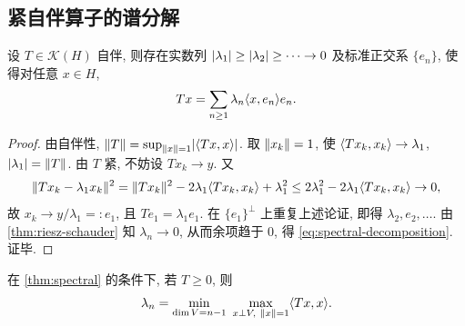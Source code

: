 \subsection{紧自伴算子的谱分解}

\begin{theorem}[谱定理]\label{thm:spectral}
设 $T\in\mathcal{K}(H)$ 自伴, 则存在实数列 $\lvert\lambda_1\rvert\ge\lvert\lambda_2\rvert\ge\cdots\to0$ 及标准正交系 $\{e_n\}$, 使得对任意 $x\in H$,
\begin{equation}\label{eq:spectral-decomposition}
  Tx=\sum_{n\ge1}\lambda_n\langle x,e_n\rangle e_n .
\end{equation}
\end{theorem}

\begin{proof}
由自伴性, $\lVert T\rVert=\sup_{\lVert x\rVert=1}\lvert\langle Tx,x\rangle\rvert$. 取 $\lVert x_k\rVert=1$, 使 $\langle Tx_k,x_k\rangle\to\lambda_1$, $\lvert\lambda_1\rvert=\lVert T\rVert$. 由 $T$ 紧, 不妨设 $Tx_k\to y$. 又
\begin{equation*}
  \lVert Tx_k-\lambda_1x_k\rVert^2=\lVert Tx_k\rVert^2-2\lambda_1\langle Tx_k,x_k\rangle+\lambda_1^2\le2\lambda_1^2-2\lambda_1\langle Tx_k,x_k\rangle\to0,
\end{equation*}
故 $x_k\to y/\lambda_1=:e_1$, 且 $Te_1=\lambda_1e_1$. 在 $\{e_1\}^{\perp}$ 上重复上述论证, 即得 $\lambda_2,e_2,\dots$. 由 \cref{thm:riesz-schauder} 知 $\lambda_n\to0$, 从而余项趋于 $0$, 得 \cref{eq:spectral-decomposition}. 证毕.
\end{proof}

\begin{corollary}\label{cor:minmax}
在 \cref{thm:spectral} 的条件下, 若 $T\ge0$, 则
\begin{equation}\label{eq:minmax}
  \lambda_n=\min_{\dim V=n-1}\ \max_{x\perp V,\ \norm{x}=1}\inner{Tx,x}.
\end{equation}
\end{corollary}
